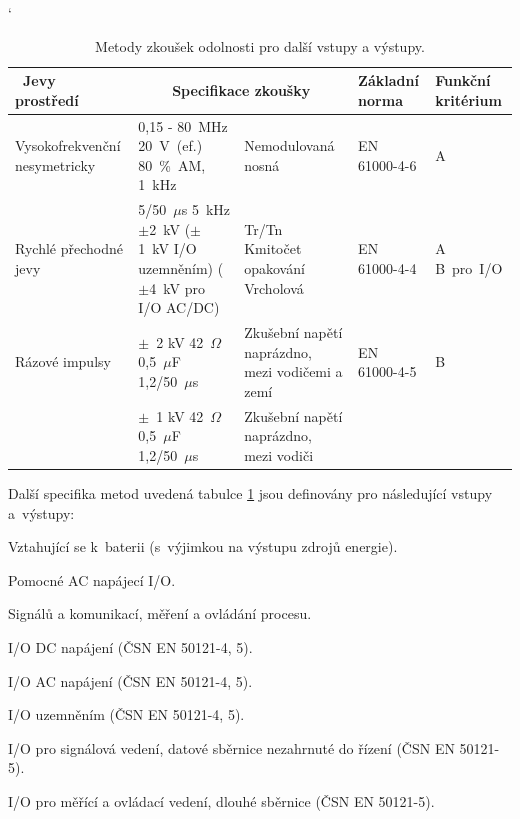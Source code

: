 \begin{table}[!h]
\catcode`
\begin{center}
  	\caption{Metody zkoušek odolnosti pro další vstupy a výstupy.}
  	\label{tab:emc_odolnosti2}
\begin{tabular}{|p{}|p{}|p{}|p{}|p{}|}
	\hline
	{\bf\ Jevy prostředí} 	& \multicolumn{2}{c}{\bf Specifikace zkoušky}\vline & {\bf Základní norma} & {\bf Funkční kritérium} \\
	\hline
	\hline
Vysokofrekvenční nesymetricky & 0,15 - 80~MHz 20~V~(ef.) 80~\%~AM, 1~kHz & Nemodulovaná nosná	& \begin{center}EN 61000-4-6 \end{center}& \begin{center} A~\end{center} \\ 
	\hline
Rychlé přechodné jevy & 5/50~$\mu$s 5~kHz $\pm$2~kV ($\pm$1~kV I/O uzemněním) ($\pm$4~kV pro I/O AC/DC)& Tr/Tn Kmitočet opakování Vrcholová & \begin{center}  EN 61000-4-4 \end{center} & \begin{center} A \mbox{B pro I/O} \end{center} \\
	\hline
	Rázové impulsy & $\pm$~2 kV 42~$\Omega$ 0,5~$\mu$F 1,2/50~$\mu$s  & Zkušební napětí naprázdno, mezi vodičemi a zemí & \begin{center}  EN 61000-4-5 \end{center} & \begin{center} B \end{center} \\
	\cline{2-3}
			& $\pm$~1 kV 42~$\Omega$ 0,5~$\mu$F 1,2/50~$\mu$s& Zkušební napětí naprázdno, mezi vodiči &  &  \\
	\hline
\end{tabular}
\end{center}
\end{table}
Další specifika metod uvedená tabulce \ref{tab:emc_odolnosti2} jsou definovány pro následující vstupy a~výstupy:
\begin{itemize*}
\item Vztahující se k~baterii  (s~výjimkou na výstupu zdrojů energie).
\item Pomocné AC napájecí I/O.
\item Signálů a komunikací, měření a ovládání procesu.
\item I/O DC napájení (ČSN EN 50121-4, 5).
\item I/O AC napájení (ČSN EN 50121-4, 5).
\item I/O uzemněním (ČSN EN 50121-4, 5).
\item I/O pro signálová vedení, datové sběrnice nezahrnuté do řízení (ČSN EN 50121-5).
\item I/O pro měřící a ovládací vedení, dlouhé sběrnice (ČSN EN 50121-5).
\end{itemize*}


